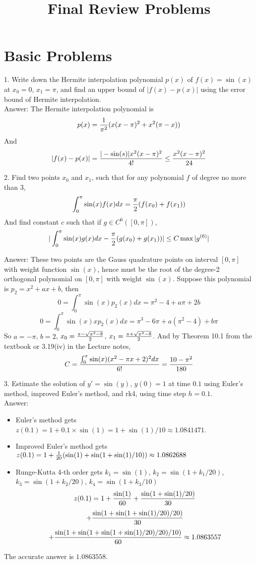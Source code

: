 \documentclass[20pt]{article} %
\title{Final Review Problems}
\theoremstyle{break}
\begin{document}
\maketitle


\section{Basic Problems}

1. Write down the Hermite interpolation polynomial $p(x)$ of $f(x)=\sin(x)$ at $x_0=0$, $x_1=\pi$, and find an upper bound of $|f(x)-p(x)|$ using the error bound of Hermite interpolation.\\

Answer: The Hermite interpolation polynomial is
\[p(x)={1\over \pi^2}(x(x-\pi)^2+x^2(\pi-x))\]
And
\[|f(x)-p(x)|={|-\sin(s)|x^2(x-\pi)^2\over 4!}\leq{x^2(x-\pi)^2\over 24}\]

2. Find two points $x_0$ and $x_1$, such that for any polynomial $f$ of degree no more than $3$,
\[\int_0^\pi\sin(x)f(x)dx={\pi\over 2}(f(x_0)+f(x_1))\]
And find constant $c$ such that if $g\in C^6([0, \pi])$,
\[|\int_0^\pi\sin(x)g(x)dx-{\pi\over 2}(g(x_0)+g(x_1))|\leq C\max|g^{(6)}|\]

Answer: These two points are the Gauss quadrature points on interval $[0, \pi]$ with weight function $\sin(x)$, hence must be the root of the degree-2 orthogonal polynomial on $[0, \pi]$ with weight $\sin(x)$. Suppose this polynomial is $p_2=x^2+ax+b$, then
\[0=\int_0^\pi \sin(x)p_2(x)dx=\pi^2-4+a\pi+2b\]
\[0=\int_0^\pi \sin(x)xp_2(x)dx=\pi^3-6\pi+a(\pi^2-4)+b\pi\]
So $a=-\pi$, $b=2$, $x_0={\pi-\sqrt{\pi^2-8}\over 2}$, $x_1={\pi+\sqrt{\pi^2-8}\over 2}$.
And by Theorem 10.1 from the textbook or 3.19(iv) in the Lecture notes,
\[C={\int_0^\pi\sin(x)(x^2-\pi x+2)^2dx\over 6!}={10-\pi^2\over 180}\]

3. Estimate the solution of $y'=\sin(y)$, $y(0)=1$ at time $0.1$ using Euler's method, improved Euler's method, and rk4, using time step $h=0.1$. \\

Answer:
\begin{itemize}
\item Euler's method gets $z(0.1)=1+0.1\times\sin(1)=1+\sin(1)/10\approx 1.0841471$.
\item Improved Euler's method gets $z(0.1)=1+{1\over 20}(\sin(1)+\sin(1+\sin(1)/10))\approx 1.0862688$
\item Runge-Kutta 4-th order gets $k_1=\sin(1)$, $k_2=\sin(1+k_1/20)$, $k_3=\sin(1+k_2/20)$, $k_4=\sin(1+k_3/10)$
  \[z(0.1)=1+{\sin(1)\over 60}+{\sin(1+\sin(1)/20)\over 30}\]
  \[+{\sin(1+\sin(1+\sin(1)/20)/20)\over 30}\]
  \[+{\sin(1+\sin(1+\sin(1+\sin(1)/20)/20)/10)\over 60}\approx 1.0863557\]
\end{itemize}
The accurate answer is $1.0863558$.\\
\end{document}
